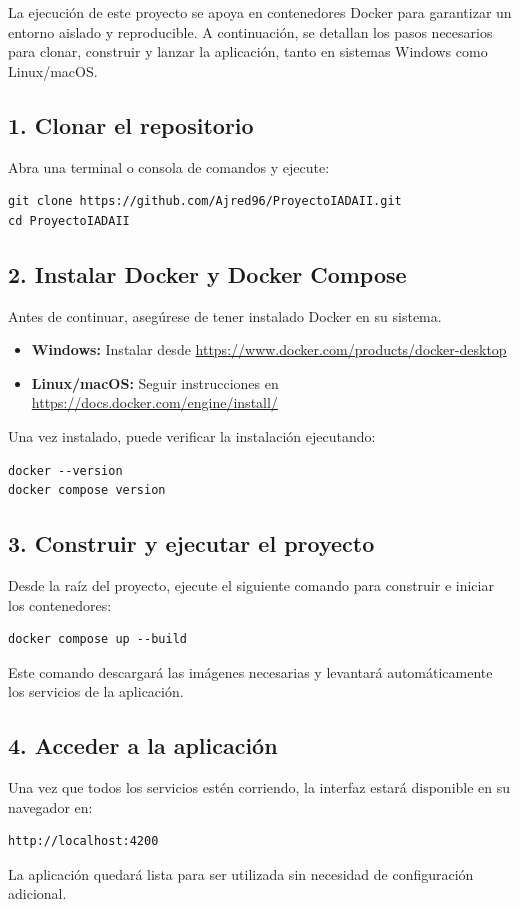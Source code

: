 \documentclass[11pt,letter]{article}
\begin{document}
La ejecución de este proyecto se apoya en contenedores Docker para garantizar un entorno aislado y reproducible. A continuación, se detallan los pasos necesarios para clonar, construir y lanzar la aplicación, tanto en sistemas Windows como Linux/macOS.

\subsection*{1. Clonar el repositorio}

Abra una terminal o consola de comandos y ejecute:

\begin{verbatim}
git clone https://github.com/Ajred96/ProyectoIADAII.git
cd ProyectoIADAII
\end{verbatim}

\subsection*{2. Instalar Docker y Docker Compose}

Antes de continuar, asegúrese de tener instalado Docker en su sistema.

\begin{itemize}
    \item \textbf{Windows:} Instalar desde \url{https://www.docker.com/products/docker-desktop}
    \item \textbf{Linux/macOS:} Seguir instrucciones en \url{https://docs.docker.com/engine/install/}
\end{itemize}

Una vez instalado, puede verificar la instalación ejecutando:

\begin{verbatim}
docker --version
docker compose version
\end{verbatim}

\subsection*{3. Construir y ejecutar el proyecto}

Desde la raíz del proyecto, ejecute el siguiente comando para construir e iniciar los contenedores:

\begin{verbatim}
docker compose up --build
\end{verbatim}

Este comando descargará las imágenes necesarias y levantará automáticamente los servicios de la aplicación.

\subsection*{4. Acceder a la aplicación}

Una vez que todos los servicios estén corriendo, la interfaz estará disponible en su navegador en:

\begin{verbatim}
http://localhost:4200
\end{verbatim}

\noindent
La aplicación quedará lista para ser utilizada sin necesidad de configuración adicional.


\newpage
\nocite{*}
\printbibliography
\end{document}
